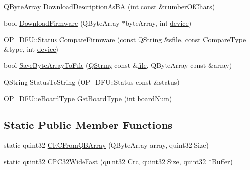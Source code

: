 \begin{DoxyCompactItemize}
\item 
\-Q\-Byte\-Array \hyperlink{group___uploader_gaa0f76d47015fa313a0bcf555bb0e690b}{\-Download\-Description\-As\-B\-A} (int const \&number\-Of\-Chars)
\item 
bool \hyperlink{group___uploader_ga8b88c71b81cbe00fe29938ac9b8a6dcf}{\-Download\-Firmware} (\-Q\-Byte\-Array $\ast$byte\-Array, int \hyperlink{struct_o_p___d_f_u_1_1device}{device})
\item 
\-O\-P\-\_\-\-D\-F\-U\-::\-Status \hyperlink{group___uploader_ga3c9852f8106d7177b5e27087f6e28764}{\-Compare\-Firmware} (const \hyperlink{group___u_a_v_objects_plugin_gab9d252f49c333c94a72f97ce3105a32d}{\-Q\-String} \&sfile, const \hyperlink{namespace_o_p___d_f_u_a687d96e45447775c09aced0f06db435b}{\-Compare\-Type} \&type, int \hyperlink{struct_o_p___d_f_u_1_1device}{device})
\item 
bool \hyperlink{group___uploader_ga1422e01836cfff2d47cd09bfbbdde774}{\-Save\-Byte\-Array\-To\-File} (\hyperlink{group___u_a_v_objects_plugin_gab9d252f49c333c94a72f97ce3105a32d}{\-Q\-String} const \&\hyperlink{uavobjecttemplate_8m_a97c04efa65bcf0928abf9260bc5cbf46}{file}, \-Q\-Byte\-Array const \&array)
\item 
\hyperlink{group___u_a_v_objects_plugin_gab9d252f49c333c94a72f97ce3105a32d}{\-Q\-String} \hyperlink{group___uploader_gae048f84f5abd2be97bbe40fcf6e193c4}{\-Status\-To\-String} (\-O\-P\-\_\-\-D\-F\-U\-::\-Status const \&status)
\item 
\hyperlink{namespace_o_p___d_f_u_a7226d41298447c34a2c489cb47c470bd}{\-O\-P\-\_\-\-D\-F\-U\-::e\-Board\-Type} \hyperlink{group___uploader_ga9376138780f2860b37c7b9ae8af3f799}{\-Get\-Board\-Type} (int board\-Num)
\end{DoxyCompactItemize}
\subsection*{\-Static \-Public \-Member \-Functions}
\begin{DoxyCompactItemize}
\item 
static quint32 \hyperlink{group___uploader_ga8b3213586813e0e852bd8e8460f02fc0}{\-C\-R\-C\-From\-Q\-B\-Array} (\-Q\-Byte\-Array array, quint32 \-Size)
\item 
static quint32 \hyperlink{group___uploader_gae755106568ea0611498e45e43bfa9e4d}{\-C\-R\-C32\-Wide\-Fast} (quint32 \-Crc, quint32 \-Size, quint32 $\ast$\-Buffer)
\end{DoxyCompactItemize}
